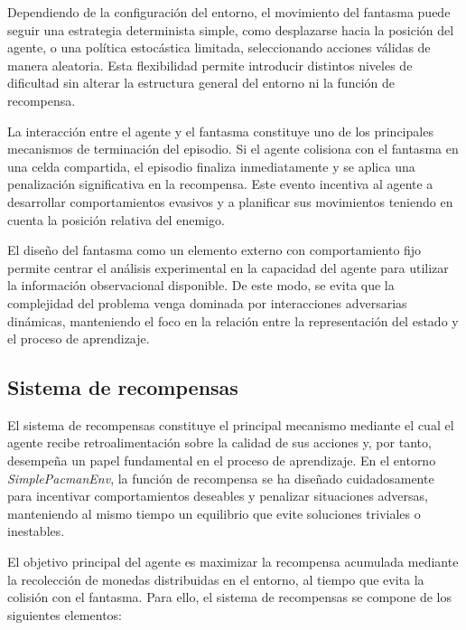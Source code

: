 Dependiendo de la configuración del entorno, el movimiento del fantasma puede seguir una estrategia determinista simple, como desplazarse hacia la posición del agente, o una política estocástica limitada, seleccionando acciones válidas de manera aleatoria. Esta flexibilidad permite introducir distintos niveles de dificultad sin alterar la estructura general del entorno ni la función de recompensa.

La interacción entre el agente y el fantasma constituye uno de los principales mecanismos de terminación del episodio. Si el agente colisiona con el fantasma en una celda compartida, el episodio finaliza inmediatamente y se aplica una penalización significativa en la recompensa. Este evento incentiva al agente a desarrollar comportamientos evasivos y a planificar sus movimientos teniendo en cuenta la posición relativa del enemigo.

El diseño del fantasma como un elemento externo con comportamiento fijo permite centrar el análisis experimental en la capacidad del agente para utilizar la información observacional disponible. De este modo, se evita que la complejidad del problema venga dominada por interacciones adversarias dinámicas, manteniendo el foco en la relación entre la representación del estado y el proceso de aprendizaje.

\subsection{Sistema de recompensas}

El sistema de recompensas constituye el principal mecanismo mediante el cual el agente recibe retroalimentación sobre la calidad de sus acciones y, por tanto, desempeña un papel fundamental en el proceso de aprendizaje. En el entorno \textit{SimplePacmanEnv}, la función de recompensa se ha diseñado cuidadosamente para incentivar comportamientos deseables y penalizar situaciones adversas, manteniendo al mismo tiempo un equilibrio que evite soluciones triviales o inestables.

El objetivo principal del agente es maximizar la recompensa acumulada mediante la recolección de monedas distribuidas en el entorno, al tiempo que evita la colisión con el fantasma. Para ello, el sistema de recompensas se compone de los siguientes elementos:

